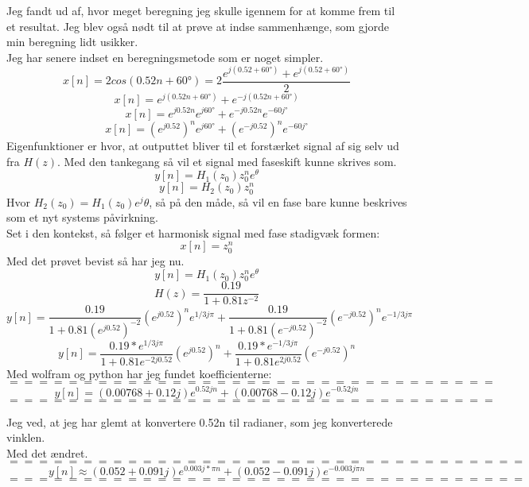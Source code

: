 \begin{Opgaver}
\begin{kapitel}
\begin{Opgave}
            \begin{UnderOpgave}[\text{Determine analytically the response $y[n]$ to the input $x[n] = 2 cos(0.52n + 60°)$.}]
                Jeg fandt ud af, hvor meget beregning jeg skulle igennem for at komme frem til et resultat. Jeg blev også nødt til at prøve at indse sammenhænge, som gjorde min beregning lidt usikker. \\
                Jeg har senere indset en beregningsmetode som er noget simpler. 
                \[x[n] = 2cos(0.52n + 60°) = 2 \frac{e^{j(0.52 + 60°)} + e^{j(0.52 + 60°)}}{2}\]
                \[x[n] = e^{j(0.52n + 60°)} + e^{-j(0.52n + 60°)}\]
                \[x[n] = e^{j0.52n}e^{j60°} + e^{-j0.52n}e^{-60j°}\]
                \[x[n] = (e^{j0.52})^ne^{j60°} + (e^{-j0.52})^ne^{-60j°}\]
                Eigenfunktioner er hvor, at outputtet bliver til et forstærket signal af sig selv ud fra $H(z)$. Med den tankegang så vil et signal med faseskift kunne skrives som. 
                \[y[n] = H_1(z_0)z_0^ne^\theta\] 
                \[y[n] = H_2(z_0)z_0^n\]
                Hvor $H_2(z_0) = H_1(z_0)e^j\theta$, så på den måde, så vil en fase bare kunne beskrives som et nyt systems påvirkning.\\
                Set i den kontekst, så følger et harmonisk signal med fase stadigvæk formen: 
                \[x[n] = z_0^n\]
                Med det prøvet bevist så har jeg nu. 
                \[y[n] = H_1(z_0)z_0^ne^\theta\] 
                \[H(z) = \frac{0.19}{1 + 0.81z^{-2}}\]
                \[y[n] = \frac{0.19}{1 + 0.81(e^{j0.52})^{-2}}(e^{j0.52})^ne^{1/3j\pi} + \frac{0.19}{1 + 0.81(e^{-j0.52})^{-2}}(e^{-j0.52})^ne^{-1/3j\pi}\] 
                \[y[n] = \frac{0.19*e^{1/3j\pi}}{1 + 0.81e^{-2j0.52}}(e^{j0.52})^n + \frac{0.19*e^{-1/3j\pi}}{1 + 0.81e^{2j0.52}}(e^{-j0.52})^n\] 
                Med wolfram og python har jeg fundet koefficienterne:
                \[=================================\]
                \[y[n] = (0.00768 + 0.12j) e^{0.52jn} + (0.00768 - 0.12j)e^{-0.52jn}\]
                \[=================================\]

                \color{red} Jeg ved, at jeg har glemt at konvertere 0.52n til radianer, som jeg konverterede vinklen. \\
                \color{teal} Med det ændret.\color{black}
                \[===================================\]
                \[y[n] \approx (0.052 + 0.091j)e^{0.003j*\pi n} + (0.052 - 0.091j)e^{-0.003j\pi n}\]
                \[===================================\]


\end{UnderOpgave}
\end{Opgave}
\end{kapitel}
\end{Opgaver}
